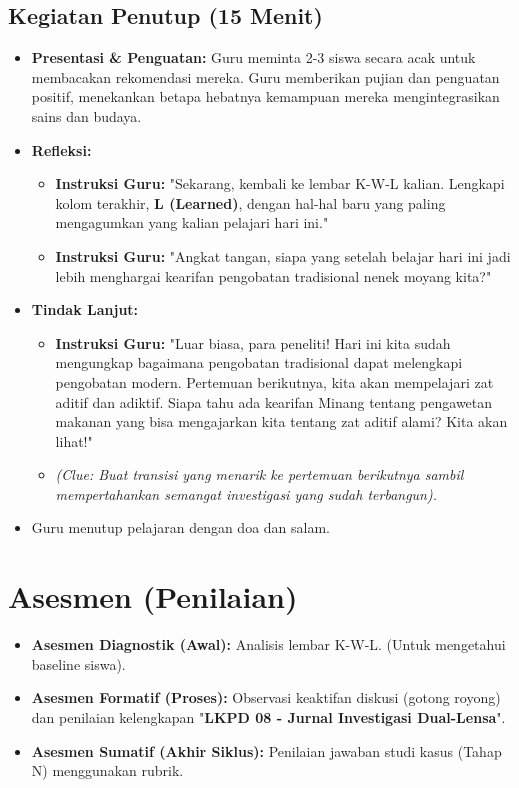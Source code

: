 \documentclass[a4paper,12pt]{article}
\begin{document}
\subsection{Kegiatan Penutup (15 Menit)}
\begin{itemize}
\item \textbf{Presentasi \& Penguatan:} Guru meminta 2-3 siswa secara acak untuk membacakan rekomendasi mereka. Guru memberikan pujian dan penguatan positif, menekankan betapa hebatnya kemampuan mereka mengintegrasikan sains dan budaya.
\item \textbf{Refleksi:}
    \begin{itemize}
    \item \textbf{Instruksi Guru:} "Sekarang, kembali ke lembar K-W-L kalian. Lengkapi kolom terakhir, \textbf{L (Learned)}, dengan hal-hal baru yang paling mengagumkan yang kalian pelajari hari ini."
    \item \textbf{Instruksi Guru:} "Angkat tangan, siapa yang setelah belajar hari ini jadi lebih menghargai kearifan pengobatan tradisional nenek moyang kita?"
    \end{itemize}
\item \textbf{Tindak Lanjut:}
    \begin{itemize}
    \item \textbf{Instruksi Guru:} "Luar biasa, para peneliti! Hari ini kita sudah mengungkap bagaimana pengobatan tradisional dapat melengkapi pengobatan modern. Pertemuan berikutnya, kita akan mempelajari zat aditif dan adiktif. Siapa tahu ada kearifan Minang tentang pengawetan makanan yang bisa mengajarkan kita tentang zat aditif alami? Kita akan lihat!"
    \item \textit{(Clue: Buat transisi yang menarik ke pertemuan berikutnya sambil mempertahankan semangat investigasi yang sudah terbangun).}
    \end{itemize}
\item Guru menutup pelajaran dengan doa dan salam.
\end{itemize}

\section{Asesmen (Penilaian)}

\begin{itemize}
\item \textbf{Asesmen Diagnostik (Awal):} Analisis lembar K-W-L. (Untuk mengetahui baseline siswa).
\item \textbf{Asesmen Formatif (Proses):} Observasi keaktifan diskusi (gotong royong) dan penilaian kelengkapan "\textbf{LKPD 08 - Jurnal Investigasi Dual-Lensa}".
\item \textbf{Asesmen Sumatif (Akhir Siklus):} Penilaian jawaban studi kasus (Tahap N) menggunakan rubrik.
\end{itemize}
\end{document}

